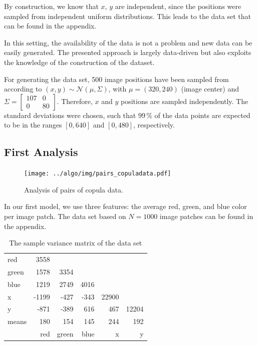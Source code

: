 \documentclass{article}
\begin{document}
By construction, we know that $x$, $y$ are independent, since the
positions were sampled from independent uniform distributions. This
leads to the data set that can be found in the appendix.


In this setting, the availability of the data is not a problem and new
data can be easily generated. The presented approach is largely
data-driven but also exploits the knowledge of the construction of the
dataset.


For generating the data set, 500 image positions have been sampled
from according to $(x, y) \sim \mathcal{N}(\mu, \Sigma)$, with $\mu =
(320, 240)$ (image center) and $\Sigma = \begin{bmatrix} 107 & 0\\
  0 & 80 \end{bmatrix}$. Therefore, $x$ and $y$ positions are sampled
independently. The standard deviations were chosen, such that 99\,\%
of the data points are expected to be in the ranges $[0, 640]$ and
$[0, 480]$, respectively.


\subsection{First Analysis}

\begin{figure}[h]
  \centering
  \texttt{[image: ../algo/img/pairs\_copuladata.pdf]}
  \caption{Analysis of pairs of copula data.}
  \label{fig:pairscopula}
\end{figure}

In our first model, we use three features: the average red, green, and
blue color per image patch. The data set based on $N = 1000$ image
patches can be found in the appendix.

\begin{table}[h]
  \centering
  \begin{tabular}{l|rrrrr}
    red   & 3558  &       &      &       &       \\
    green & 1578  & 3354  &      &       &       \\
    blue  & 1219  & 2749  & 4016 &       &       \\
    x     & -1199 & -427  & -343 & 22900 &       \\
    y     & -871  & -389  & 616  & 467   & 12204 \\
    \midrule
    means & 180   & 154   & 145  & 244   & 192   \\
    \midrule
          & red   & green & blue & x     & y
  \end{tabular}
  \caption{The sample variance matrix of the data set}
\end{table}
\end{document}
